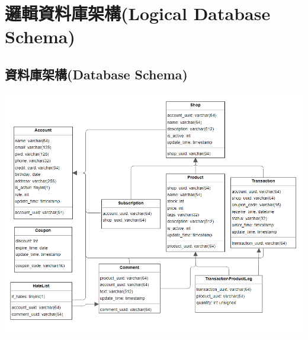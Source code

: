 \documentclass[a4paper, 12pt]{article}
\begin{document}
\section{邏輯資料庫架構(Logical Database Schema)}
\subsection{資料庫架構(Database Schema)}
\includegraphics[scale=0.7]{image/schema.png}
\newpage
\end{document}
